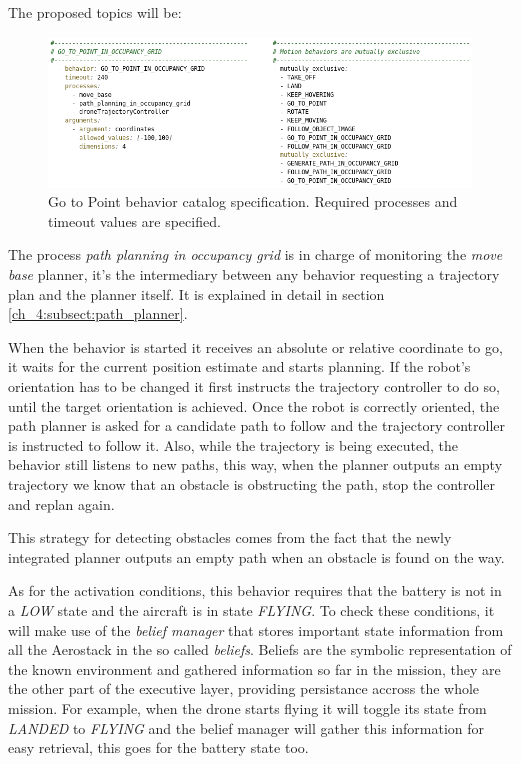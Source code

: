   The proposed topics will be:

  

  \begin{figure}[!h]
    \centering
    \includegraphics[width=\textwidth]{./Figures/BehaviorGTPCatalog.png}
    \caption{Go to Point behavior catalog specification. Required processes and timeout values are specified.}
    \label{ch_4:fig:behav_gtp_catalog}
  \end{figure}


  The process \textit{path planning in occupancy grid} is in charge of monitoring the \textit{move base} planner, it's the intermediary between any behavior requesting a trajectory plan and the planner itself. It is explained in detail in section \ref{ch_4:subsect:path_planner}.

  When the behavior is started it receives an absolute or relative coordinate to go, it waits for the current position estimate and starts planning. If the robot's orientation has to be changed it first instructs the trajectory controller to do so, until the target orientation is achieved. Once the robot is correctly oriented, the path planner is asked for a candidate path to follow and the trajectory controller is instructed to follow it. Also, while the trajectory is being executed, the behavior still listens to new paths, this way, when the planner outputs an empty trajectory we know that an obstacle is obstructing the path, stop the controller and replan again. 

  This strategy for detecting obstacles comes from the fact that the newly integrated planner outputs an empty path when an obstacle is found on the way.

  As for the activation conditions, this behavior requires that the battery is not in a \textit{LOW} state and the aircraft is in state \textit{FLYING}. To check these conditions, it will make use of the \textit{belief manager} that stores important state information from all the Aerostack in the so called \textit{beliefs}. Beliefs are the symbolic representation of the known environment and gathered information so far in the mission, they are the other part of the executive layer, providing persistance accross the whole mission. For example, when the drone starts flying it will toggle its state from \textit{LANDED} to \textit{FLYING} and the belief manager will gather this information for easy retrieval, this goes for the battery state too.

